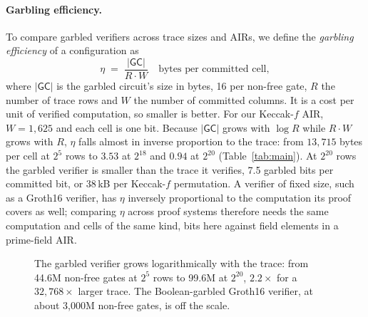 \documentclass[11pt]{article}
\begin{document}
\paragraph{Garbling efficiency.} To compare garbled verifiers across trace sizes
and AIRs, we define the \emph{garbling efficiency} of a configuration as
\[
  \eta \;=\; \frac{|\mathsf{GC}|}{R\cdot W}\quad\text{bytes per committed cell},
\]
where $|\mathsf{GC}|$ is the garbled circuit's size in bytes, 16 per non-free
gate, $R$ the number of trace rows and $W$ the number of committed columns. It is a
cost per unit of verified computation, so smaller is better. For our Keccak-$f$
AIR, $W=1{,}625$ and each cell is one bit. Because $|\mathsf{GC}|$ grows with
$\log R$ while $R\cdot W$ grows with $R$, $\eta$ falls almost in inverse
proportion to the trace: from $13{,}715$ bytes per cell at $2^5$ rows to $3.53$ at
$2^{18}$ and $0.94$ at $2^{20}$ (Table~\ref{tab:main}). At $2^{20}$ rows the garbled
verifier is smaller than the trace it verifies, 7.5 garbled bits per committed
bit, or 38\,kB per Keccak-$f$ permutation. A verifier of fixed size, such as a
Groth16 verifier, has $\eta$ inversely proportional to the computation its proof
covers as well; comparing $\eta$ across proof systems therefore needs the same
computation and cells of the same kind, bits here against field elements in a
prime-field AIR.

\begin{figure}[t]\centering
{}
\caption{The garbled verifier grows logarithmically with the trace: from 44.6M
non-free gates at $2^5$ rows to 99.6M at $2^{20}$, $2.2\times$ for a
$32{,}768\times$ larger trace. The Boolean-garbled Groth16 verifier, at about
3{,}000M non-free gates, is off the scale.}
\label{fig:scaling}
\end{figure}
\end{document}
